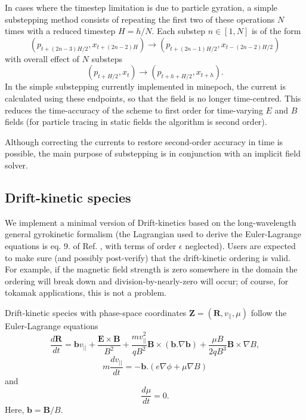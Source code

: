 \documentclass{article}
\begin{document}
In cases where the timestep limitation is due to particle gyration, a simple substepping method consists of repeating the first two of these operations $N$ times with a reduced timestep $H=h/N$. Each substep $n \in [1,N]$ is of the form
\begin{equation}
   (p_{t + (2 n - 3) H/2},x_{ t + (2 n -2 ) H} ) \rightarrow (p_{t + (2 n - 1) H/2},x_{t- (2 n -2 )H/2})
\end{equation}
with overall effect of $N$ substeps 
  \begin{equation}
   (p_{t +  H/2},x_{ t} ) \rightarrow (p_{t + h + H/2},x_{t + h}).
\end{equation} 
  In the simple substepping currently implemented in minepoch, the current is calculated using these endpoints, so that the field is no longer time-centred. This reduces the time-accuracy of the scheme to first order for time-varying $E$ and $B$ fields (for particle tracing in static fields the algorithm is second order).

Although correcting the currents to restore  second-order accuracy in time is possible, the main purpose of substepping is in conjunction with an implicit field solver. 
  
\subsection{Drift-kinetic species}

We implement a minimal version of Drift-kinetics based on the long-wavelength general gyrokinetic formalism (the Lagrangian used to derive the Euler-Lagrange equations is eq. 9. of Ref. \cite{mcmillansharma}, with terms of order $\epsilon$ neglected). Users are expected to make sure (and possibly post-verify) that the drift-kinetic ordering is valid. For example, if the magnetic field strength is zero somewhere in the domain the ordering will break down and division-by-nearly-zero will occur; of course, for tokamak applications, this is not a problem.

Drift-kinetic species with phase-space coordinates $\mathbf{Z}=(\mathbf{R},v_{||},\mu)$ follow the Euler-Lagrange equations
\begin{equation}
  \frac{d \mathbf{R}}{dt} = \mathbf{b} v_{||}
  + \frac{\mathbf{E} \times \mathbf{B}}{B^2}
  + \frac{m v_{||}^2}{q B^2} \mathbf{B} \times \left( \mathbf{b} . \nabla \mathbf{b} \right)
  + \frac{\mu B}{2 q B^3} \mathbf{B} \times \nabla B,
\end{equation}
\begin{equation}
  m \frac{d v_{||}}{dt} = - \mathbf{b} . ( e \nabla \phi + \mu \nabla B )  
\end{equation}
and
\begin{equation}
  \frac{d \mu}{dt} = 0.
\end{equation}
Here, $\mathbf{b} = \mathbf{B}/B$.
\end{document}

